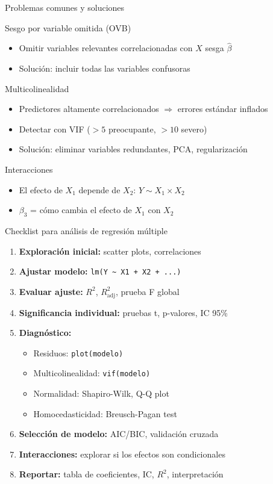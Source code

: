 \documentclass[aspectratio=169, 11pt]{beamer}
\begin{document}
\begin{frame}{Problemas comunes y soluciones}
\begin{block}{Sesgo por variable omitida (OVB)}
\begin{itemize}
  \item Omitir variables relevantes correlacionadas con $X$ sesga $\hat{\beta}$
  \item Soluci\'on: incluir todas las variables confusoras
\end{itemize}
\end{block}

\begin{block}{Multicolinealidad}
\begin{itemize}
  \item Predictores altamente correlacionados $\Rightarrow$ errores est\'andar inflados
  \item Detectar con VIF ($> 5$ preocupante, $> 10$ severo)
  \item Soluci\'on: eliminar variables redundantes, PCA, regularizaci\'on
\end{itemize}
\end{block}

\begin{block}{Interacciones}
\begin{itemize}
  \item El efecto de $X_1$ depende de $X_2$: $Y \sim X_1 \times X_2$
  \item $\beta_3$ = c\'omo cambia el efecto de $X_1$ con $X_2$
\end{itemize}
\end{block}
\end{frame}

\begin{frame}{Checklist para análisis de regresión múltiple}
\begin{enumerate}
  \item \textbf{Exploración inicial:} scatter plots, correlaciones
  \item \textbf{Ajustar modelo:} \texttt{lm(Y \textasciitilde{} X1 + X2 + ...)}
  \item \textbf{Evaluar ajuste:} $R^2$, $R^2_{\text{adj}}$, prueba F global
  \item \textbf{Significancia individual:} pruebas t, p-valores, IC 95\%
  \item \textbf{Diagnóstico:}
    \begin{itemize}
      \item Residuos: \texttt{plot(modelo)}
      \item Multicolinealidad: \texttt{vif(modelo)}
      \item Normalidad: Shapiro-Wilk, Q-Q plot
      \item Homocedasticidad: Breusch-Pagan test
    \end{itemize}
  \item \textbf{Selección de modelo:} AIC/BIC, validación cruzada
  \item \textbf{Interacciones:} explorar si los efectos son condicionales
  \item \textbf{Reportar:} tabla de coeficientes, IC, $R^2$, interpretación
\end{enumerate}
\end{frame}
\end{document}
